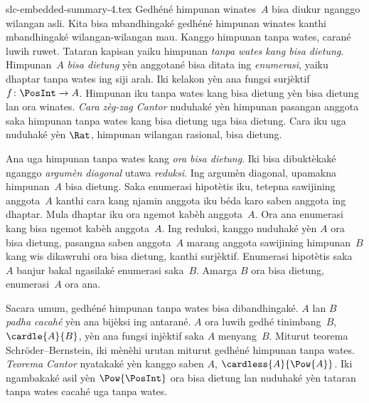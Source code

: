 \begin{filecontents*}[overwrite]{slc-embedded-summary-4.tex}
Gedhéné himpunan winates~$A$ bisa diukur nganggo wilangan asli.
Kita bisa mbandhingaké gedhéné himpunan winates kanthi mbandhingaké
wilangan-wilangan mau. Kanggo himpunan tanpa wates, carané luwih
ruwet. Tataran kapisan yaiku himpunan \emph{tanpa wates kang bisa
dietung}. Himpunan~$A$ \emph{bisa dietung} yèn anggotané bisa
ditata ing \emph{enumerasi}, yaiku dhaptar tanpa wates ing siji
arah. Iki kelakon yèn ana fungsi surjèktif $f\colon\PosInt\to A$.
Himpunan iku tanpa wates kang bisa dietung yèn bisa dietung lan
ora winates. \emph{Cara zèg-zag Cantor} nuduhaké yèn himpunan
pasangan anggota saka himpunan tanpa wates kang bisa dietung
uga bisa dietung. Cara iku uga nuduhaké yèn $\Rat$, himpunan
wilangan rasional, bisa dietung.

Ana uga himpunan tanpa wates kang \emph{ora bisa dietung}.
Iki bisa dibuktèkaké nganggo \emph{argumèn diagonal} utawa
\emph{reduksi}. Ing argumèn diagonal, upamakna himpunan~$A$
bisa dietung. Saka enumerasi hipotètis iku, tetepna sawijining
anggota~$A$ kanthi cara kang njamin anggota iku béda karo saben
anggota ing dhaptar. Mula dhaptar iku ora ngemot kabèh anggota~$A$.
Ora ana enumerasi kang bisa ngemot kabèh anggota~$A$.
Ing reduksi, kanggo nuduhaké yèn $A$ ora bisa dietung, pasangna
saben anggota~$A$ marang anggota sawijining himpunan~$B$ kang wis
dikawruhi ora bisa dietung, kanthi surjèktif. Enumerasi hipotètis
saka~$A$ banjur bakal ngasilaké enumerasi saka~$B$. Amarga $B$
ora bisa dietung, enumerasi~$A$ ora ana.

Sacara umum, gedhéné himpunan tanpa wates bisa dibandhingaké.
$A$ lan $B$ \emph{padha cacahé} yèn ana bijèksi ing antarané.
$A$ ora luwih gedhé tinimbang~$B$, $\cardle{A}{B}$, yèn ana
fungsi injèktif saka $A$ menyang~$B$. Miturut teorema
Schr\"oder--Bernstein, iki mènèhi urutan miturut gedhéné
himpunan tanpa wates. \emph{Teorema Cantor} nyatakaké yèn
kanggo saben $A$, $\cardless{A}{\Pow{A}}$. Iki ngambakaké
asil yèn $\Pow{\PosInt}$ ora bisa dietung lan nuduhaké yèn
tataran tanpa wates cacahé uga tanpa wates.
\end{filecontents*}

